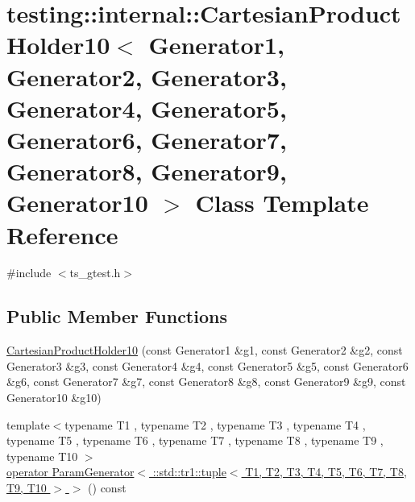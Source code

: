 \hypertarget{classtesting_1_1internal_1_1CartesianProductHolder10}{\section{testing\-:\-:internal\-:\-:Cartesian\-Product\-Holder10$<$ Generator1, Generator2, Generator3, Generator4, Generator5, Generator6, Generator7, Generator8, Generator9, Generator10 $>$ Class Template Reference}
\label{classtesting_1_1internal_1_1CartesianProductHolder10}
}


{\ttfamily \#include $<$ts\-\_\-gtest.\-h$>$}

\subsection*{Public Member Functions}
\begin{DoxyCompactItemize}
\item 
\hyperlink{classtesting_1_1internal_1_1CartesianProductHolder10_a3255f824dd20e02b8bb718bb7d3d3634}{Cartesian\-Product\-Holder10} (const Generator1 \&g1, const Generator2 \&g2, const Generator3 \&g3, const Generator4 \&g4, const Generator5 \&g5, const Generator6 \&g6, const Generator7 \&g7, const Generator8 \&g8, const Generator9 \&g9, const Generator10 \&g10)
\item 
{\footnotesize template$<$typename T1 , typename T2 , typename T3 , typename T4 , typename T5 , typename T6 , typename T7 , typename T8 , typename T9 , typename T10 $>$ }\\\hyperlink{classtesting_1_1internal_1_1CartesianProductHolder10_a12d69df36cfa423afb9726e712149447}{operator Param\-Generator$<$ \-::std\-::tr1\-::tuple$<$ T1, T2, T3, T4, T5, T6, T7, T8, T9, T10 $>$ $>$} () const 
\end{DoxyCompactItemize}


